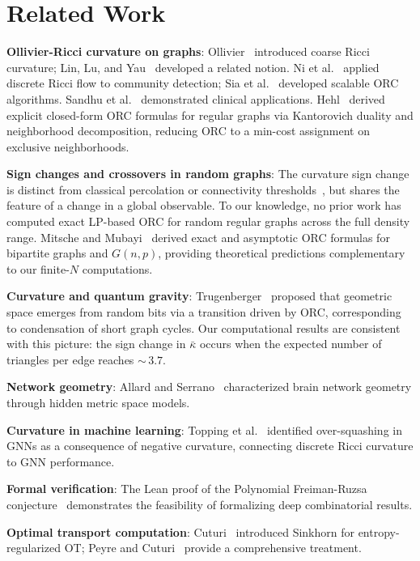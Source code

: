 \documentclass[12pt]{article}
\newcommand{\kbar}{\bar{\kappa}}
\begin{document}
\section{Related Work}
\label{sec:related}

\textbf{Ollivier-Ricci curvature on graphs}: Ollivier~\cite{Ollivier2009} introduced coarse
Ricci curvature; Lin, Lu, and Yau~\cite{Lin2011} developed a related notion. Ni et
al.~\cite{Ni2019} applied discrete Ricci flow to community detection; Sia et
al.~\cite{Sia2019} developed scalable ORC algorithms. Sandhu et al.~\cite{Sandhu2015}
demonstrated clinical applications. Hehl~\cite{Hehl2024} derived explicit closed-form ORC
formulas for regular graphs via Kantorovich duality and neighborhood decomposition,
reducing ORC to a min-cost assignment on exclusive neighborhoods.

\textbf{Sign changes and crossovers in random graphs}: The curvature sign change is distinct from
classical percolation or connectivity thresholds~\cite{Bollobas2001}, but shares the feature
of a change in a global observable. To our knowledge, no prior work has computed exact
LP-based ORC for random regular graphs across the full density range.
Mitsche and Mubayi~\cite{Mitsche2015} derived exact and asymptotic ORC formulas for bipartite
graphs and $G(n,p)$, providing theoretical predictions complementary to our finite-$N$ computations.

\textbf{Curvature and quantum gravity}: Trugenberger~\cite{Trugenberger2017} proposed that
geometric space emerges from random bits via a transition driven by ORC, corresponding to
condensation of short graph cycles. Our computational results are consistent with this
picture: the sign change in $\kbar$ occurs when the expected number of triangles per edge
reaches ${\sim}\,3.7$.

\textbf{Network geometry}: Allard and Serrano~\cite{Allard2020} characterized brain network
geometry through hidden metric space models.

\textbf{Curvature in machine learning}: Topping et al.~\cite{Topping2022} identified
over-squashing in GNNs as a consequence of negative curvature, connecting discrete Ricci
curvature to GNN performance.

\textbf{Formal verification}: The Lean proof of the Polynomial Freiman-Ruzsa
conjecture~\cite{Tao2023} demonstrates the feasibility of formalizing deep combinatorial
results.

\textbf{Optimal transport computation}: Cuturi~\cite{Cuturi2013} introduced Sinkhorn for
entropy-regularized OT; Peyre and Cuturi~\cite{Peyre2019} provide a comprehensive
treatment.
\end{document}
